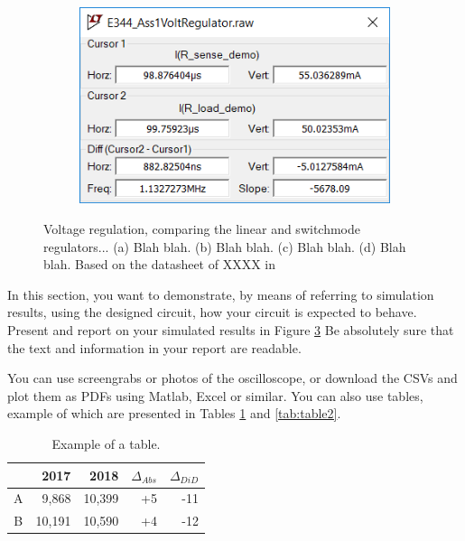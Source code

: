 \begin{figure}
\begin{subfigure}[]{0.55\textwidth}
		    \caption{} \label{subfig:pwr_simu_rect}
     \end{subfigure}
    \begin{subfigure}[]{0.4\textwidth}
              \centering
  		\includegraphics[width=1\linewidth]{./Figures/Screengrab2}
		    \caption{} \label{subfig:pwr_simu_rect}
     \end{subfigure}
   \caption[\textcolor{red}{I am the short caption that appears in the List of Figures list, without references}]{Voltage regulation, comparing the linear and switchmode regulators... (a)  Blah blah. (b)  Blah blah.  (c)  Blah blah. (d) Blah blah.   Based on the datasheet of XXXX in \cite{WebsiteOpAmp}}
    \label{fig:simulation_results_box}
 \end{figure}

In this section, you want to demonstrate, by means of referring to simulation results, using the designed circuit, how your circuit is expected to behave. Present and report on your simulated results in Figure \ref{fig:simulation_results_box} Be absolutely sure that the text and information in your report are readable. 

You can use screengrabs or photos of the oscilloscope, or download the CSVs and plot them as PDFs using Matlab, Excel or similar. 
You can also use tables, example of which are presented in Tables \ref{tab:table1} and \ref{tab:table2}.


\begin{table}
        \centering
        \footnotesize
        \caption{Example of a table.}
         \begin{tabular}{c@{\qquad}rrrr}
          \toprule
             & 2017 & 2018 & $\Delta_{Abs}$ & $\Delta_{DiD}$\\
          \midrule
          A & 9,868      & 10,399 & +5 & -11\\
          B & 10,191     & 10,590 & +4 & -12\\
          \bottomrule
        \end{tabular}
     \label{tab:table1}
\end{table}


